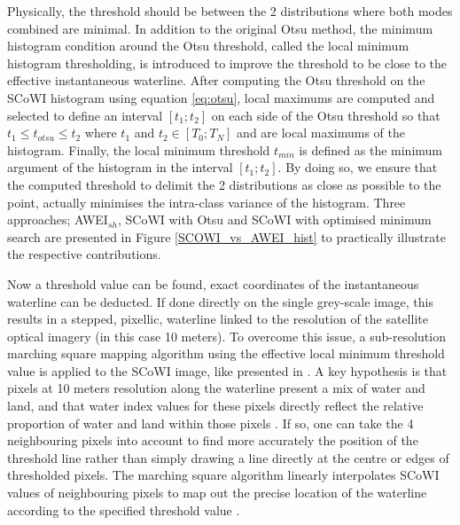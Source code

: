 \documentclass[remotesensing,technicalnote,submit,pdftex,moreauthors]{Definitions/mdpi}
\begin{document}
Physically, the threshold should be between the 2 distributions where both modes combined are minimal. In addition to the original Otsu method, the minimum histogram condition around the Otsu threshold, called the local minimum histogram thresholding, is introduced to improve the threshold to be close to the effective instantaneous waterline. After computing the Otsu threshold on the SCoWI histogram using equation \ref{eq:otsu}, local maximums are computed and selected to define an interval $[t_1 ; t_2]$ on each side of the Otsu threshold so that $t_1 \le t_{otsu} \le t_2$ where $t_1$ and $t_2 \in [T_0;T_N]$ and are local maximums of the histogram. Finally, the local minimum threshold $t_{min}$ is defined as the minimum argument of the histogram in the interval $[t_1 ; t_2]$. By doing so, we ensure that the computed threshold to delimit the 2 distributions as close as possible to the point, actually minimises the intra-class variance of the histogram. Three approaches; AWEI$_{sh}$, SCoWI with Otsu and SCoWI with optimised minimum search are presented in Figure \ref{SCOWI_vs_AWEI_hist} to practically illustrate the respective contributions.

Now a threshold value can be found, exact coordinates of the instantaneous waterline can be deducted. If done directly on the single grey-scale image, this results in a stepped, pixellic, waterline linked to the resolution of the satellite optical imagery (in this case 10 meters). To overcome this issue, a sub-resolution marching square mapping algorithm using the effective local minimum threshold value is applied to the SCoWI image, like presented in \citet{VOS2019_sub}. A key hypothesis is that pixels at 10 meters resolution along the waterline present a mix of water and land, and that water index values for these pixels directly reflect the relative proportion of water and land within those pixels \citep{Bishop_sub_pixel}. If so, one can take the 4 neighbouring pixels into account to find more accurately the position of the threshold line rather than simply drawing a line directly at the centre or edges of thresholded pixels. The marching square algorithm linearly interpolates SCoWI values of neighbouring pixels to map out the precise location of the waterline according to the specified threshold value \citep{CIPOLLETTI201287}.
\end{document}
